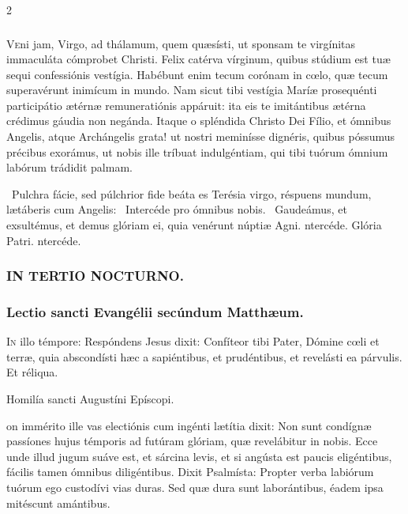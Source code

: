 \documentclass[9pt,twoside]{extarticle}
\begin{document}
\begin{multicols}{2}
\subsubsection*{\center {}}
\lettrine{V}eni jam, Virgo, ad thálamum, quem quæsísti, ut sponsam te virgínitas immaculáta cómprobet Christi. Felix catérva vírginum, quibus stúdium est tuæ sequi confessiónis vestígia. Habébunt enim tecum corónam in cœlo, quæ tecum superavérunt inimícum in mundo. Nam sicut tibi vestígia Maríæ prosequénti participátio ætérnæ remuneratiónis appáruit: ita eis te imitántibus ætérna crédimus gáudia non negánda. Itaque o spléndida Christo Dei Fílio, et ómnibus Angelis, atque Archángelis grata! ut nostri meminísse dignéris, quibus póssumus précibus exorámus, ut nobis ille tríbuat indulgéntiam, qui tibi tuórum ómnium labórum trádidit palmam. 

\begin{tightlist}{}
\item {}~Pulchra fácie, sed púlchrior fide beáta es Terésia virgo, réspuens mundum, lætáberis cum Angelis: \textred{*}~Intercéde pro ómnibus nobis. ~Gaudeámus, et exsultémus, et demus glóriam ei, quia venérunt núptiæ Agni. ntercéde. Glória Patri. ntercéde.
\end{tightlist}

\subsubsection*{\center \textsc{IN TERTIO NOCTURNO.}}
\subsubsection*{\center Lectio sancti Evangélii secúndum Matthæum.}
\begin{center}\end{center}
\lettrine{I}n illo témpore: Respóndens Jesus dixit: Confíteor tibi Pater, Dómine cœli et terræ, quia abscondísti hæc a sapiéntibus, et prudéntibus, et revelásti ea párvulis. Et réliqua.

\begin{center}Homilía sancti Augustíni Epíscopi.\\
\end{center}
on immérito ille vas electiónis cum ingénti lætítia dixit: Non sunt condígnæ passíones hujus témporis ad futúram glóriam, quæ revelábitur in nobis. Ecce unde illud jugum suáve est, et sárcina levis, et si angústa est paucis eligéntibus, fácilis tamen ómnibus diligéntibus. Dixit Psalmísta: Propter verba labiórum tuórum ego custodívi vias duras. Sed quæ dura sunt laborántibus, éadem ipsa mitéscunt amántibus.


\end{multicols}
\end{document}
